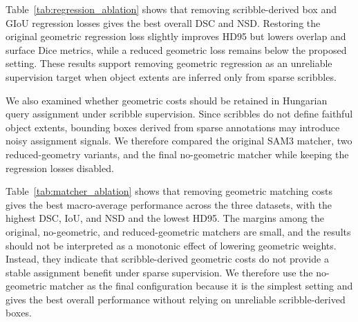 \documentclass[preprint,12pt]{elsarticle}
\begin{document}
Table~\ref{tab:regression_ablation} shows that removing scribble-derived box and GIoU regression losses gives the best overall DSC and NSD. Restoring the original geometric regression loss slightly improves HD95 but lowers overlap and surface Dice metrics, while a reduced geometric loss remains below the proposed setting. These results support removing geometric regression as an unreliable supervision target when object extents are inferred only from sparse scribbles.

We also examined whether geometric costs should be retained in Hungarian query assignment under scribble supervision. Since scribbles do not define faithful object extents, bounding boxes derived from sparse annotations may introduce noisy assignment signals. We therefore compared the original SAM3 matcher, two reduced-geometry variants, and the final no-geometric matcher while keeping the regression losses disabled.

\begin{table}[!htbp]
\centering
\caption{Ablation study of Hungarian matching costs under scribble supervision. All variants use the same training and evaluation protocol; only the classification, box, and GIoU matching costs are changed. DSC, IoU, and NSD are macro-averaged over ACDC, BTCV\_cervix, and PROMISE12 and reported as percentages; HD95 is reported in millimeters.}
\label{tab:matcher_ablation}
\setlength{\tabcolsep}{5pt}
\end{table}

Table~\ref{tab:matcher_ablation} shows that removing geometric matching costs gives the best macro-average performance across the three datasets, with the highest DSC, IoU, and NSD and the lowest HD95. The margins among the original, no-geometric, and reduced-geometric matchers are small, and the results should not be interpreted as a monotonic effect of lowering geometric weights. Instead, they indicate that scribble-derived geometric costs do not provide a stable assignment benefit under sparse supervision. We therefore use the no-geometric matcher as the final configuration because it is the simplest setting and gives the best overall performance without relying on unreliable scribble-derived boxes.
\end{document}
